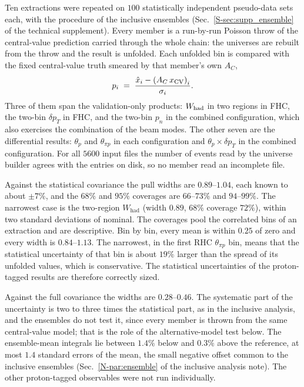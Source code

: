 \documentclass[11pt,a4paper]{article}
\newcommand{\suppref}[2]{#1~\ref{S-#2} of the technical supplement}
\newcommand{\noteref}[2]{#1~\ref{N-#2} of the inclusive analysis note}
\begin{document}
Ten extractions were repeated on $100$ statistically independent pseudo-data sets each, with the
procedure of the inclusive ensembles (\suppref{Sec.}{sec:supp_ensemble}). Every member is a run-by-run
Poisson throw of the central-value prediction carried through the whole chain: the universes are
rebuilt from the throw and the result is unfolded. Each unfolded bin is compared with the fixed
central-value truth smeared by that member's own $A_C$,
\[
  p_i \;=\; \frac{\hat{x}_i - \left(A_C\,x_{\rm CV}\right)_i}{\sigma_i}.
\]
Three of them span the validation-only products: $W_{\rm had}$ in two regions in FHC, the two-bin
$\delta p_T$ in FHC, and the two-bin $p_n$ in the combined configuration, which also exercises the
combination of the beam modes. The other seven are the differential  results:
$\theta_p$ and $\theta_{\pi p}$ in each configuration and $\theta_p\times\delta p_T$ in the combined
configuration. For all $5600$ input files the number of events read by the universe builder agrees
with the entries on disk, so no member read an incomplete file.



Against the statistical covariance the pull widths are $0.89$--$1.04$, each known to about $\pm7\%$,
and the $68\%$ and $95\%$ coverages are $66$--$73\%$ and $94$--$99\%$. The narrowest case is the two-region
$W_\mathrm{had}$ (width $0.89$, $68\%$ coverage $72\%$), within two standard deviations of nominal. The
coverages pool the correlated bins of an extraction and are descriptive. Bin by bin, every mean
is within $0.25$ of zero and every width is $0.84$--$1.13$. The narrowest, in the first RHC
$\theta_{\pi p}$ bin, means that the statistical uncertainty of that bin is about $19\%$ larger than the
spread of its unfolded values, which is conservative. The statistical uncertainties of the
proton-tagged results are therefore correctly sized.

Against the full covariance the widths are $0.28$--$0.46$. The systematic part of the uncertainty is
two to three times the statistical part, as in the inclusive analysis, and the ensembles do not test
it, since every member is thrown from the same central-value model; that is the role of the
alternative-model test below. The ensemble-mean integrals lie between $1.4\%$ below and $0.3\%$ above
the reference, at most $1.4$ standard errors of the mean, the small negative offset common to the
inclusive ensembles (\noteref{Sec.}{par:ensemble}). The other proton-tagged observables were not run
individually.
\end{document}
